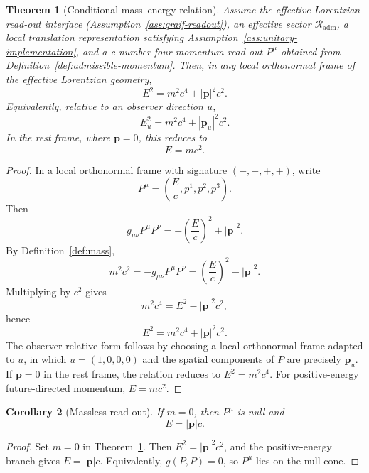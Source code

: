 \documentclass[12pt,a4paper]{article}
\newtheorem{theorem}{Theorem}[section]
\newtheorem{corollary}[theorem]{Corollary}
\theoremstyle{definition}
\theoremstyle{remark}
\newcommand{\Rout}{\mathcal{R}_{\mathrm{adm}}}
\begin{document}
\begin{theorem}[Conditional mass--energy relation]
\label{thm:mass-energy}
Assume the effective Lorentzian read-out interface (Assumption~\ref{ass:qraif-readout}), an effective sector $\Rout$, a local translation representation satisfying Assumption~\ref{ass:unitary-implementation}, and a c-number four-momentum read-out $P^\mu$ obtained from Definition~\ref{def:admissible-momentum}. Then, in any local orthonormal frame of the effective Lorentzian geometry,
\begin{equation}
E^2=m^2c^4+|\mathbf p|^2c^2 .
\end{equation}
Equivalently, relative to an observer direction $u$,
\begin{equation}
E_u^2=m^2c^4+|\mathbf p_u|^2c^2 .
\end{equation}
In the rest frame, where $\mathbf p=0$, this reduces to
\begin{equation}
E=mc^2 .
\end{equation}
\end{theorem}

\begin{proof}
In a local orthonormal frame with signature $(-,+,+,+)$, write
\[
P^\mu=\left(\frac{E}{c},p^1,p^2,p^3\right).
\]
Then
\[
g_{\mu\nu}P^\mu P^\nu
=-\left(\frac{E}{c}\right)^2+|\mathbf p|^2 .
\]
By Definition~\ref{def:mass},
\[
m^2c^2=-g_{\mu\nu}P^\mu P^\nu
=\left(\frac{E}{c}\right)^2-|\mathbf p|^2 .
\]
Multiplying by $c^2$ gives
\[
m^2c^4=E^2-|\mathbf p|^2c^2,
\]
hence
\[
E^2=m^2c^4+|\mathbf p|^2c^2 .
\]
The observer-relative form follows by choosing a local orthonormal frame adapted to $u$, in which $u=(1,0,0,0)$ and the spatial components of $P$ are precisely $\mathbf p_u$. If $\mathbf p=0$ in the rest frame, the relation reduces to $E^2=m^2c^4$. For positive-energy future-directed momentum, $E=mc^2$.
\end{proof}

\begin{corollary}[Massless read-out]
\label{cor:massless}
If $m=0$, then $P^\mu$ is null and
\begin{equation}
E=|\mathbf p|c .
\end{equation}
\end{corollary}

\begin{proof}
Set $m=0$ in Theorem~\ref{thm:mass-energy}. Then $E^2=|\mathbf p|^2c^2$, and the positive-energy branch gives $E=|\mathbf p|c$. Equivalently, $g(P,P)=0$, so $P^\mu$ lies on the null cone.
\end{proof}
\end{document}

